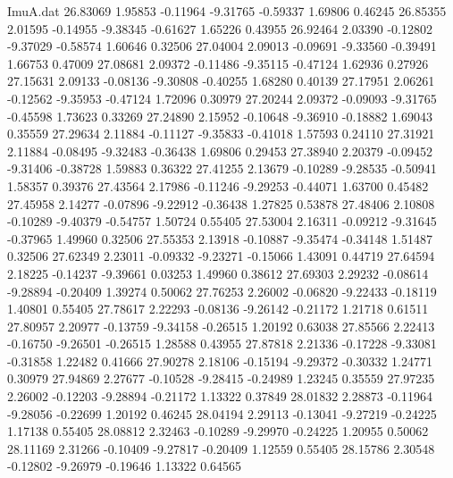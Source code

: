 \begin{filecontents}{ImuA.dat}
  26.83069    1.95853   -0.11964   -9.31765   -0.59337    1.69806    0.46245
  26.85355    2.01595   -0.14955   -9.38345   -0.61627    1.65226    0.43955
  26.92464    2.03390   -0.12802   -9.37029   -0.58574    1.60646    0.32506
  27.04004    2.09013   -0.09691   -9.33560   -0.39491    1.66753    0.47009
  27.08681    2.09372   -0.11486   -9.35115   -0.47124    1.62936    0.27926
  27.15631    2.09133   -0.08136   -9.30808   -0.40255    1.68280    0.40139
  27.17951    2.06261   -0.12562   -9.35953   -0.47124    1.72096    0.30979
  27.20244    2.09372   -0.09093   -9.31765   -0.45598    1.73623    0.33269
  27.24890    2.15952   -0.10648   -9.36910   -0.18882    1.69043    0.35559
  27.29634    2.11884   -0.11127   -9.35833   -0.41018    1.57593    0.24110
  27.31921    2.11884   -0.08495   -9.32483   -0.36438    1.69806    0.29453
  27.38940    2.20379   -0.09452   -9.31406   -0.38728    1.59883    0.36322
  27.41255    2.13679   -0.10289   -9.28535   -0.50941    1.58357    0.39376
  27.43564    2.17986   -0.11246   -9.29253   -0.44071    1.63700    0.45482
  27.45958    2.14277   -0.07896   -9.22912   -0.36438    1.27825    0.53878
  27.48406    2.10808   -0.10289   -9.40379   -0.54757    1.50724    0.55405
  27.53004    2.16311   -0.09212   -9.31645   -0.37965    1.49960    0.32506
  27.55353    2.13918   -0.10887   -9.35474   -0.34148    1.51487    0.32506
  27.62349    2.23011   -0.09332   -9.23271   -0.15066    1.43091    0.44719
  27.64594    2.18225   -0.14237   -9.39661    0.03253    1.49960    0.38612
  27.69303    2.29232   -0.08614   -9.28894   -0.20409    1.39274    0.50062
  27.76253    2.26002   -0.06820   -9.22433   -0.18119    1.40801    0.55405
  27.78617    2.22293   -0.08136   -9.26142   -0.21172    1.21718    0.61511
  27.80957    2.20977   -0.13759   -9.34158   -0.26515    1.20192    0.63038
  27.85566    2.22413   -0.16750   -9.26501   -0.26515    1.28588    0.43955
  27.87818    2.21336   -0.17228   -9.33081   -0.31858    1.22482    0.41666
  27.90278    2.18106   -0.15194   -9.29372   -0.30332    1.24771    0.30979
  27.94869    2.27677   -0.10528   -9.28415   -0.24989    1.23245    0.35559
  27.97235    2.26002   -0.12203   -9.28894   -0.21172    1.13322    0.37849
  28.01832    2.28873   -0.11964   -9.28056   -0.22699    1.20192    0.46245
  28.04194    2.29113   -0.13041   -9.27219   -0.24225    1.17138    0.55405
  28.08812    2.32463   -0.10289   -9.29970   -0.24225    1.20955    0.50062
  28.11169    2.31266   -0.10409   -9.27817   -0.20409    1.12559    0.55405
  28.15786    2.30548   -0.12802   -9.26979   -0.19646    1.13322    0.64565

\end{filecontents}
